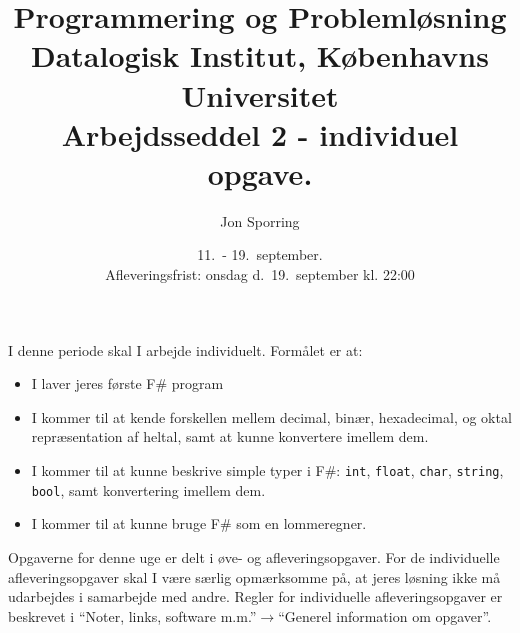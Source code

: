 \documentclass[a4paper,12pt]{article}
\title{Programmering og Problemløsning\\Datalogisk Institut,
  Københavns Universitet\\Arbejdsseddel 2 - individuel opgave.}
\author{Jon Sporring}
\date{11.\ - 19.\ september.\\Afleveringsfrist: onsdag d.\ 19.\ september kl. 22:00}
\begin{document}
\maketitle

I denne periode skal I arbejde individuelt. Formålet er at:
\begin{itemize}
\item I laver jeres første F\# program
\item I kommer til at kende forskellen mellem decimal, binær, hexadecimal, og oktal repræsentation af heltal, samt at kunne konvertere imellem dem.
\item I kommer til at kunne beskrive simple typer i F\#: \lstinline{int}, \lstinline{float}, \lstinline{char}, \lstinline{string}, \lstinline{bool}, samt konvertering imellem dem.
\item I kommer til at kunne bruge F\# som en lommeregner.
\end{itemize}

Opgaverne for denne uge er delt i øve- og afleveringsopgaver. For de individuelle afleveringsopgaver skal I være særlig opmærksomme på, at jeres løsning ikke må udarbejdes i samarbejde med andre. Regler for individuelle afleveringsopgaver er beskrevet i "`Noter, links, software m.m."'$\rightarrow$"`Generel information om opgaver"'.
\end{document}
